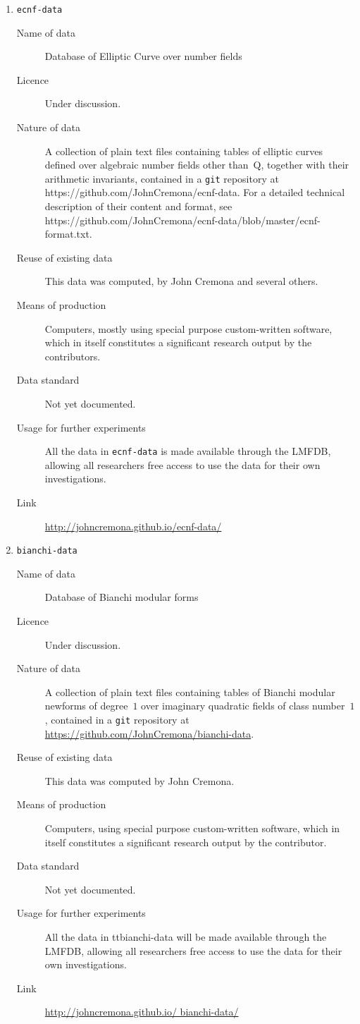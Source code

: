 \documentclass{deliverablereport}
\begin{document}
\begin{enumerate}
\item{{\tt ecnf-data}}
\begin{description}
\item[Name of data] Database of Elliptic Curve over number fields \item[Licence]  Under discussion.
\item[Nature of data] A collection of plain text files containing tables of elliptic curves defined over algebraic number fields other than~Q, together with their arithmetic invariants, contained in a {\tt git} repository at https://github.com/JohnCremona/ecnf-data. For a detailed technical description of their content and format,  see https://github.com/JohnCremona/ecnf-data/blob/master/ecnf-format.txt.
\item[Reuse of existing data] This data was computed, by John Cremona and several others.
\item[Means of production] Computers, mostly using special purpose custom-written software, which in itself constitutes a significant research output by the contributors.
\item[Data standard] Not yet documented.
\item [Usage for further experiments] All the data in {\tt ecnf-data} is made available through the LMFDB, allowing all researchers free access to use the data for their own investigations.
\item [Link] \url{http://johncremona.github.io/ecnf-data/}
\end{description}

\item{{\tt bianchi-data}}
\begin{description}
\item[Name of data] Database of Bianchi modular forms
\item[Licence]  Under discussion.
\item[Nature of data] A collection of plain text files containing tables of Bianchi modular newforms of degree~$1$ over imaginary quadratic fields of class number~$1$, contained in a {\tt git} repository at \url{https://github.com/JohnCremona/bianchi-data}.
\item[Reuse of existing data] This data was computed by John Cremona.
\item[Means of production] Computers, using special purpose custom-written software, which in itself constitutes a significant research output by the contributor.
\item[Data standard] Not yet documented.
\item [Usage for further experiments] All the data in {ttbianchi-data} will be made available through the LMFDB, allowing all researchers free access to use the data for their own investigations.
\item [Link] \url{http://johncremona.github.io/ bianchi-data/}
\end{description}




\end{enumerate}
\end{document}
